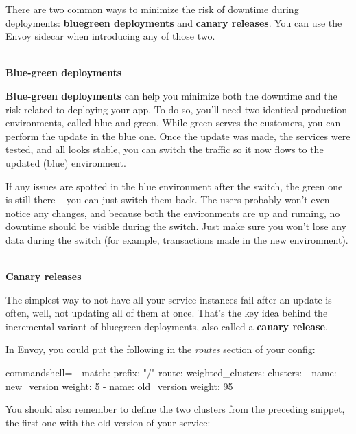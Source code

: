 
There are two common ways to minimize the risk of downtime during deployments: \textbf{bluegreen deployments} and \textbf{canary releases}. You can use the Envoy sidecar when introducing any of those two.

\hspace*{\fill} \\ %
\noindent
\textbf{Blue-green deployments}

\textbf{Blue-green deployments} can help you minimize both the downtime and the risk related to deploying your app. To do so, you'll need two identical production environments, called blue and green. While green serves the customers, you can perform the update in the blue one. Once the update was made, the services were tested, and all looks stable, you can switch the traffic so it now flows to the updated (blue) environment.

If any issues are spotted in the blue environment after the switch, the green one is still there – you can just switch them back. The users probably won't even notice any changes, and because both the environments are up and running, no downtime should be visible during the switch. Just make sure you won't lose any data during the switch (for example, transactions made in the new environment).


\hspace*{\fill} \\ %
\noindent
\textbf{Canary releases}

The simplest way to not have all your service instances fail after an update is often, well, not updating all of them at once. That's the key idea behind the incremental variant of bluegreen deployments, also called a \textbf{canary release}.

In Envoy, you could put the following in the \textit{routes} section of your config:


\begin{tcblisting}{commandshell={}}
- match:
    prefix: "/"
  route:
    weighted_clusters:
      clusters:
      - name: new_version
        weight: 5
      - name: old_version
        weight: 95

\end{tcblisting}

You should also remember to define the two clusters from the preceding snippet, the first one with the old version of your service:


